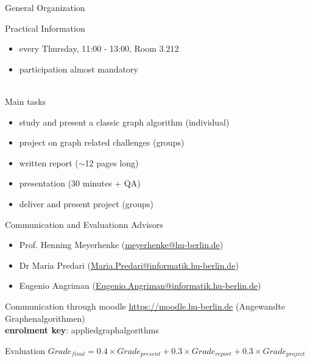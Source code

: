 \documentclass[titlepage,german,presentation]{beamer}
\begin{document}
\begin{frame}{General Organization}

  Practical Information
  \begin{itemize}
  \item every Thursday, 11:00 - 13:00, Room 3.212
  \item participation almost mandatory
  \end{itemize}
  ~\\
  Main tasks
  \begin{itemize}
  \item study and present a classic graph algorithm (individual)
  \item project on graph related challenges (groups)
  \item written report ($\sim$12 pages long)
  \item presentation (30 minutes + QA)
  \item deliver and present project (groups)  
\end{itemize}
\end{frame}

\begin{frame}{Communication and Evaluationn}
  Advisors
  \begin{itemize}
  \item Prof. Henning Meyerhenke (\url{meyerhenke@hu-berlin.de})
  \item Dr Maria Predari (\url{Maria.Predari@informatik.hu-berlin.de})
  \item Eugenio Angriman (\url{Eugenio.Angriman@informatik.hu-berlin.de})
\end{itemize}
  Communication through moodle \url{https://moodle.hu-berlin.de} (Angewandte Graphenalgorithmen)\\
  
  {\bf enrolment key}: appliedgraphalgorithms

  \begin{block}{Evaluation}
  $Grade_{final} = 0.4 \times Grade_{present} + 0.3 \times Grade_{report} + 0.3 \times Grade_{project}$
  \end{block}
\end{frame}
\end{document}
